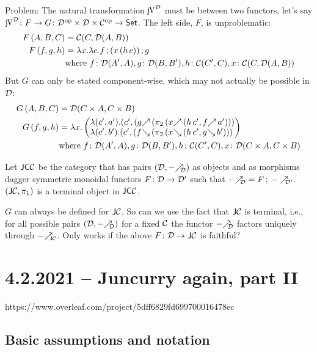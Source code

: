 \documentclass[runningheads,envcountsame]{llncs}
\begin{document}
Problem: The natural transformation $\juncurry[\D]$ must be between two functors, let's say $\juncurry[\D]\colon F \to G\colon \op{\D} \times \D \times \op{\C} \to \Set$. The left side, $F$, is unproblematic:
\begin{align}
    F\,(A, B, C) &= \C(C, \homD{A}{B}) \\
    F\,(f, g, h) &= \lambda x. \lambda c. \comp{f}{\comp{(x\,(h\,c))}{g}} \\
                 &\text{where }f\colon \D(A', A), g\colon \D(B, B'), h\colon \C(C', C), x\colon \C(C, \homD{A}{B})
\end{align}
But $G$ can only be stated component-wise, which may not actually be possible in $\mathcal{D}$:
\begin{align}
    G\,(A, B, C) &= \D(C \times A, C \times B) \\
    G\,(f, g, h) &= \lambda x. \janus{\lambda (c', a'). (c', (\f{g}\,(\pi_2\,(\f{x}\,(h\,c', \f{f}\,a')))}
                                     {\lambda (c', b'). (c', (\b{f}\,(\pi_2\,(\b{x}\,(h\,c', \b{g}\,b')))} \\
                 &\text{where }f\colon \D(A', A), g\colon \D(B, B'), h\colon \C(C', C), x\colon \D(C \times A, C \times B)
\end{align}

\begin{proposition}
Let $\mathsf{JC}\mathcal{C}$ be the category that has pairs $(\D, \f[\D]{-})$ as objects and as morphisms dagger symmetric monoidal functors $F\colon \mathcal{D} \to \mathcal{D}'$ such that $\f[\D]{-} = \comp{F}{\f[\D']{-}}$. $(\mathsf{J}\mathcal{C}, \pi_1)$ is a terminal object in $\mathsf{JC}\mathcal{C}$. 
\end{proposition}

$G$ can always be defined for $\mathsf{J}\mathcal{C}$. So can we use the fact that $\mathsf{J}\mathcal{C}$ is terminal, i.e., for all possible pairs $(\D, \f[\D]{-})$ for a fixed $\mathcal{C}$ the functor $\f[\D]{-}$ factors uniquely through $\f[\JC]{-}$. Only works if the above $F\colon \mathcal{D} \to \mathsf{J}\mathcal{C}$ is faithful?

\section{4.2.2021 -- Juncurry again, part II}https://www.overleaf.com/project/5dff6829fd699700016478ec

\subsection{Basic assumptions and notation}
\end{document}
